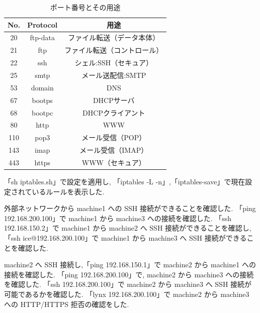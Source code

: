 \documentclass{ltjsarticle} %
\begin{document}
\begin{table}[H] %
  \centering %
  \caption{ポート番号とその用途}
  \begin{tabular}{|c|c|c|} 
  \hline %
  No. & Protocol & 用途  \\ \hline  \hline %
  20 & ftp-data & ファイル転送（データ本体）  \\ \hline %
  21 & ftp & ファイル転送（コントロール）    \\ \hline %
  22 & ssh & シェル:SSH（セキュア）  \\ \hline %
  25 & smtp & メール送配信:SMTP   \\ \hline %
  53 & domain & DNS   \\ \hline %
  67 & bootps & DHCPサーバ   \\ \hline %
  68 & bootpc & DHCPクライアント   \\ \hline %
  80 & http  & WWW   \\ \hline %
  110 & pop3 & メール受信（POP）   \\ \hline %
  143 & imap & メール受信（IMAP）  \\ \hline %
  443 & https & WWW（セキュア）  \\ \hline %
  \end{tabular}
  \label{tab:port} %
\end{table}

「sh iptables.sh」で設定を適用し, 「iptables -L -n」,「iptables-save」で現在設定されているルールを表示した. 

外部ネットワークから machine1 への SSH 接続ができることを確認した. 
「ping 192.168.200.100」で machine1 から machine3 への接続を確認した. 
「ssh 192.168.150.2」で machine1 から machine2 へ SSH 接続ができることを確認し, 
「ssh ice@192.168.200.100」で machine1 から machine3 へ SSH 接続ができることを確認した. 

machine2 へ SSH 接続し,「ping 192.168.150.1」で machine2 から machine1 への接続を確認した. 
「ping 192.168.200.100」で, machine2 から machine3 への接続を確認した. 
「ssh 192.168.200.100」で machine2 から machine3 へ SSH 接続が可能であるかを確認した. 
「lynx 192.168.200.100」で machine2 から machine3 への HTTP/HTTPS 拒否の確認をした. 
\end{document}
